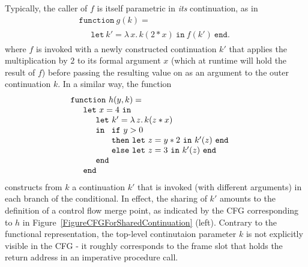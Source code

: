 Typically, the caller of $f$ is itself parametric in \emph{its}
continuation, as in
\begin{equation}
\label{ContinuationCode3}
\begin{array}{l}
\mathtt{function}\ g (k) =\\
\quad
\begin{array}{l}
\mathtt{let}\ k' = \lambda\, x .\, k (2*x)\ \mathtt{in}\ f(k')\ \mathtt{end}.
\end{array}
\end{array}
\end{equation}
where $f$ is invoked with a newly constructed continuation $k'$ that
applies the multiplication by $2$ to its formal
argument $x$ (which at runtime will hold the result of $f$) before
passing the resulting value on as an argument to the outer
continuation $k$.
In a similar way, the function
\begin{equation}
\label{ContinuationCode4}
\begin{array}{l}
\mathtt{function}\ h (y, k) =\\
\quad
  \begin{array}{l}
    \mathtt{let}\ x=4\ \mathtt{in} \\
    \quad \begin{array}{l}
            \mathtt{let}\ k' = \lambda\, z .\, k (z*x)\\
            \mathtt{in}\
               \begin{array}[t]{l}
                 \mathtt{if}\ y>0\\
                 \mathtt{then\ let}\ z = y*2\ \mathtt{in}\ k'(z)\ \mathtt{end}\\
                 \mathtt{else\ let}\ z = 3\ \mathtt{in}\ k'(z)\ \mathtt{end}
               \end{array}\\
            \mathtt{end}
          \end{array} \\
    \mathtt{end}
  \end{array}
\end{array}
\end{equation}
constructs from $k$ a continuation $k'$ that is invoked (with
different arguments) in each branch of the conditional. In effect,
the sharing of $k'$ amounts to the definition of a control flow merge
point, as indicated by the CFG corresponding to $h$ in
Figure~\ref{FigureCFGForSharedContinuation} (left).  Contrary to the
functional representation, the top-level continutaion parameter $k$ is
not explicitly visible in the CFG - it roughly corresponds to the
frame slot that holds the return address in an imperative procedure
call.

